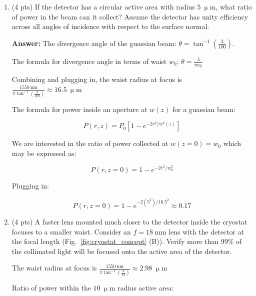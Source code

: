 \documentclass[12pt]{caltech_thesis}
\begin{document}
\begin{enumerate}
\def\labelenumi{\arabic{enumi}.}
\item
  (4 pts) If the detector has a circular active area with radius
  \(5~\mathrm{\upmu m}\), what ratio of power in the beam can it
  collect? Assume the detector has unity efficiency across all angles of
  incidence with respect to the surface normal.

  {\color{midnightblue}  \textbf{Answer:} } {\color{midnightblue}  The
  divergence angle of the guassian beam:
  \(\theta = \tan^{-1}({\frac{3}{100}})\). }

  {\color{midnightblue}  The formula for divergence angle in terms of
  waist \(w_0\): \(\theta = \frac{\lambda}{\pi w_0}\) }

  {\color{midnightblue}  Combining and plugging in, the waist radius at
  focus is
  \(\frac{1550~\mathrm{nm}}{\pi \tan^{-1}(\frac{3}{100})} \approx 16.5~ \mathrm{\upmu m}\)
  }

  {\color{midnightblue}  The formula for power inside an aperture at
  \(w(z)\) for a guassian beam:}

  {\color{midnightblue} 

  \[P(r, z)=P_{0}\left[1-e^{-2 r^{2} / w^{2}(z)}\right]\]

  }

  {\color{midnightblue} We are interested in the ratio of power
  collected at \(w(z=0) = w_0\) which may be expressed as:}

  {\color{midnightblue} 

  \[P(r, z=0)=1-e^{-2 r^{2} / w_0^{2}}\]

  }

  {\color{midnightblue} Plugging in: }

  {\color{midnightblue} 

  \[P(r, z=0)=1-e^{-2(5^{2}) / 16.5^{2}} \approx  \boxed{0.17} \]

  }
\item
  (4 pts) A faster lens mounted much closer to the detector inside the
  cryostat focuses to a smaller waist. Consider an
  \(f = 18~\mathrm{mm}\) lens with the detector at the focal length
  (Fig.~\ref{fig:cryostat_concept} (B)). Verify more than 99\% of the
  collimated light will be focused onto the active area of the detector.

  {\color{midnightblue}  The waist radius at focus is
  \(\frac{1550~\mathrm{nm}}{\pi \tan^{-1}(\frac{3}{18})} \approx 2.98~\mathrm{\upmu m}\)
  }

  {\color{midnightblue} Ratio of power within the
  \(10~\mathrm{\upmu m}\) radius active area: }


\end{enumerate}
\end{document}
